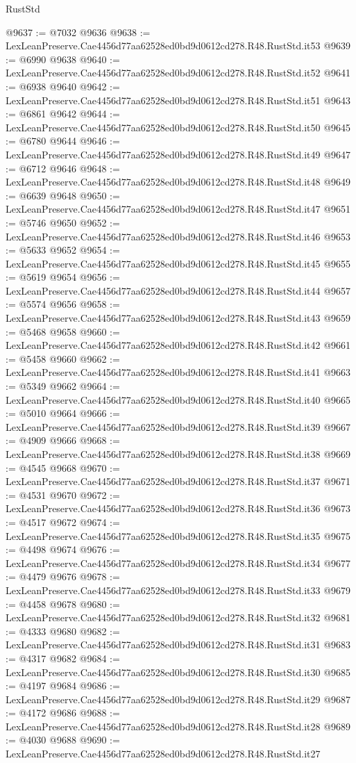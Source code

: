 \begin{lexlean}{RustStd}
\begin{coremodule}
@9637 := @7032 @9636
@9638 := LexLeanPreserve.Cae4456d77aa62528ed0bd9d0612cd278.R48.RustStd.it53
@9639 := @6990 @9638
@9640 := LexLeanPreserve.Cae4456d77aa62528ed0bd9d0612cd278.R48.RustStd.it52
@9641 := @6938 @9640
@9642 := LexLeanPreserve.Cae4456d77aa62528ed0bd9d0612cd278.R48.RustStd.it51
@9643 := @6861 @9642
@9644 := LexLeanPreserve.Cae4456d77aa62528ed0bd9d0612cd278.R48.RustStd.it50
@9645 := @6780 @9644
@9646 := LexLeanPreserve.Cae4456d77aa62528ed0bd9d0612cd278.R48.RustStd.it49
@9647 := @6712 @9646
@9648 := LexLeanPreserve.Cae4456d77aa62528ed0bd9d0612cd278.R48.RustStd.it48
@9649 := @6639 @9648
@9650 := LexLeanPreserve.Cae4456d77aa62528ed0bd9d0612cd278.R48.RustStd.it47
@9651 := @5746 @9650
@9652 := LexLeanPreserve.Cae4456d77aa62528ed0bd9d0612cd278.R48.RustStd.it46
@9653 := @5633 @9652
@9654 := LexLeanPreserve.Cae4456d77aa62528ed0bd9d0612cd278.R48.RustStd.it45
@9655 := @5619 @9654
@9656 := LexLeanPreserve.Cae4456d77aa62528ed0bd9d0612cd278.R48.RustStd.it44
@9657 := @5574 @9656
@9658 := LexLeanPreserve.Cae4456d77aa62528ed0bd9d0612cd278.R48.RustStd.it43
@9659 := @5468 @9658
@9660 := LexLeanPreserve.Cae4456d77aa62528ed0bd9d0612cd278.R48.RustStd.it42
@9661 := @5458 @9660
@9662 := LexLeanPreserve.Cae4456d77aa62528ed0bd9d0612cd278.R48.RustStd.it41
@9663 := @5349 @9662
@9664 := LexLeanPreserve.Cae4456d77aa62528ed0bd9d0612cd278.R48.RustStd.it40
@9665 := @5010 @9664
@9666 := LexLeanPreserve.Cae4456d77aa62528ed0bd9d0612cd278.R48.RustStd.it39
@9667 := @4909 @9666
@9668 := LexLeanPreserve.Cae4456d77aa62528ed0bd9d0612cd278.R48.RustStd.it38
@9669 := @4545 @9668
@9670 := LexLeanPreserve.Cae4456d77aa62528ed0bd9d0612cd278.R48.RustStd.it37
@9671 := @4531 @9670
@9672 := LexLeanPreserve.Cae4456d77aa62528ed0bd9d0612cd278.R48.RustStd.it36
@9673 := @4517 @9672
@9674 := LexLeanPreserve.Cae4456d77aa62528ed0bd9d0612cd278.R48.RustStd.it35
@9675 := @4498 @9674
@9676 := LexLeanPreserve.Cae4456d77aa62528ed0bd9d0612cd278.R48.RustStd.it34
@9677 := @4479 @9676
@9678 := LexLeanPreserve.Cae4456d77aa62528ed0bd9d0612cd278.R48.RustStd.it33
@9679 := @4458 @9678
@9680 := LexLeanPreserve.Cae4456d77aa62528ed0bd9d0612cd278.R48.RustStd.it32
@9681 := @4333 @9680
@9682 := LexLeanPreserve.Cae4456d77aa62528ed0bd9d0612cd278.R48.RustStd.it31
@9683 := @4317 @9682
@9684 := LexLeanPreserve.Cae4456d77aa62528ed0bd9d0612cd278.R48.RustStd.it30
@9685 := @4197 @9684
@9686 := LexLeanPreserve.Cae4456d77aa62528ed0bd9d0612cd278.R48.RustStd.it29
@9687 := @4172 @9686
@9688 := LexLeanPreserve.Cae4456d77aa62528ed0bd9d0612cd278.R48.RustStd.it28
@9689 := @4030 @9688
@9690 := LexLeanPreserve.Cae4456d77aa62528ed0bd9d0612cd278.R48.RustStd.it27

\end{coremodule}
\end{lexlean}
